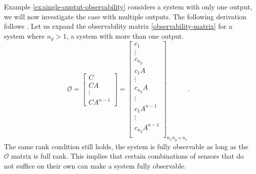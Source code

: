 Example \ref{ex:single-ouptut-observability} considers a system with only one output, we will now investigate the case with multiple outputs. The following derivation follows \cite[Section 3.4 D 2]{Antsaklis2006LinearProcessing}. Let us expand the observability matrix \eqref{observability-matrix} for a system where $n_y>1$, a system with more than one output.
\begin{equation*}
\mathcal{O}=
\begin{bmatrix}
    C \\
    CA \\
    \vdots \\
    CA^{n-1}
\end{bmatrix}    
=
\begin{bmatrix}
    c_1 \\
    \vdots \\
    c_{n_y} \\
    c_1A \\
    \vdots \\
    c_{n_y}A \\
    \vdots \\
    c_1A^{n-1}\\
    \vdots \\
    c_{n_y}A^{n-1} \\
\end{bmatrix}_{n_xn_y \times n_x}.
\end{equation*}
The same rank condition still holds, the system is fully observable as long as the $\mathcal{O}$ matrix is full rank. This implies that certain combinations of sensors that do not suffice on their own can make a system fully observable.

